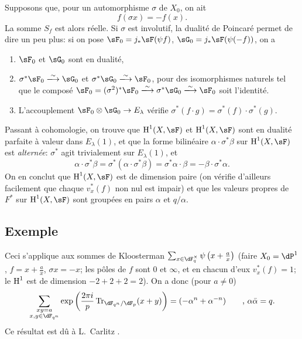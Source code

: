 Supposons que, pour un automorphisme $\sigma$ de $X_0$, on ait 
\[
  f(\sigma x) = - f(x) \text{.} 
\]
La somme $S_f$ est alors réelle. Si $\sigma$ est involutif, la dualité de 
Poincaré permet de dire un peu plus: si on pose 
$\sF_0=j_\ast \sF(\psi f)$, $\sG_0 = j_\ast \sF(\psi(-f))$, on a 
\begin{enumerate}[\indent a)]
  \item $\sF_0$ et $\sG_0$ sont en dualité, 
  \item $\sigma^\ast \sF_0 \iso \sG_0$ et $\sigma^\ast \sG_0 \iso \sF_0$, pour 
    des isomorphismes naturels tel que le composé 
    $\sF_0=(\sigma^2)^\ast \sF_0 \iso \sigma^\ast \sG_0 \iso \sF_0$ soit 
    l'identité. 
  \item L'accouplement $\sF_0\otimes \sG_0 \to E_\lambda$ vérifie 
    $\sigma^\ast(f\cdot g) = \sigma^\ast(f) \cdot \sigma^\ast (g)$. 
\end{enumerate} 

Passant à cohomologie, on trouve que $\h^1(X,\sF)$ et $\h^1(X,\sF)$ sont en 
dualité parfaite à valeur dans $E_\lambda(1)$, et que la forme bilinéaire 
$\alpha\cdot \sigma^\ast\beta$ sur $\h^1(X,\sF)$ est \emph{alternée}: 
$\sigma^\ast$ agit trivialement sur $E_\lambda(1)$, et 
\[
  \alpha\cdot \sigma^\ast \beta = \sigma^\ast(\alpha\cdot \sigma^\ast \beta) = \sigma^\ast \alpha\cdot \beta = -\beta\cdot \sigma^\ast \alpha \text{.} 
\]
On en conclut que $\h^1(X,\sF)$ est de dimension paire (on vérifie d'ailleurs 
facilement que chaque $v_x^\ast(f)$ non nul est impair) et que les valeurs 
propres de $F^\ast$ sur $\h^1(X,\sF)$ sont groupées en pairs $\alpha$ et 
$q/\alpha$. 





\subsection{Exemple}\label{VI:3-7}

Ceci s'applique aux sommes de Kloosterman 
$\sum_{x\in \dF_q^\times} \psi\left(x+\frac a x\right)$ (faire 
$X_0=\dP^1$, $f=x+\frac a x$, $\sigma x=-x$; les pôles de $f$ sont $0$ et 
$\infty$, et en chacun d'eux $v_x^\ast(f)=1$; le $\operatorname{H}^1$ est de dimension 
$-2+2+2=2$). On a donc (pour $a\ne 0$) 
\[
  \sum_{\substack{x y=a \\ x,y\in \dF_{q^n}}} \exp\left(\frac{2\pi i}{p} \tr_{\dF_{q^n}/\dF_p}(x+y)\right) = (-\alpha^n+\alpha^{-n}) \qquad \text{, }\alpha\bar \alpha = q \text{.} 
\]
Ce résultat est dû à L.\ Carlitz \cite{ca69}. 

